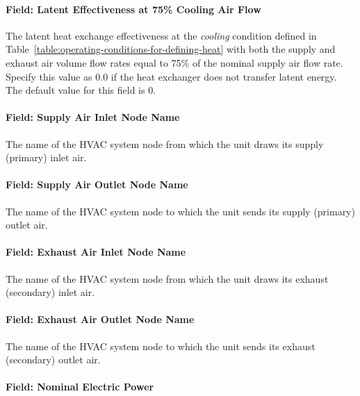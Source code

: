 \paragraph{Field: Latent Effectiveness at 75\% Cooling Air Flow}\label{field-latent-effectiveness-at-75-cooling-air-flow}

The latent heat exchange effectiveness at the \emph{cooling} condition defined in Table~\ref{table:operating-conditions-for-defining-heat} with both the supply and exhaust air volume flow rates equal to 75\% of the nominal supply air flow rate. Specify this value as 0.0 if the heat exchanger does not transfer latent energy. The default value for this field is 0.

\paragraph{Field: Supply Air Inlet Node Name}\label{field-supply-air-inlet-node-name-1-000}

The name of the HVAC system node from which the unit draws its supply (primary) inlet air.

\paragraph{Field: Supply Air Outlet Node Name}\label{field-supply-air-outlet-node-name-1}

The name of the HVAC system node to which the unit sends its supply (primary) outlet air.

\paragraph{Field: Exhaust Air Inlet Node Name}\label{field-exhaust-air-inlet-node-name}

The name of the HVAC system node from which the unit draws its exhaust (secondary) inlet air.

\paragraph{Field: Exhaust Air Outlet Node Name}\label{field-exhaust-air-outlet-node-name}

The name of the HVAC system node to which the unit sends its exhaust (secondary) outlet air.

\paragraph{Field: Nominal Electric Power}\label{field-nominal-electric-power-1}

